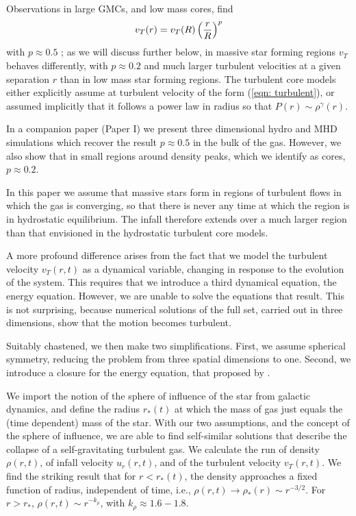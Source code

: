 \documentclass[iop,apj,numberedappendix]{emulateapj}
\newcommand       \be		{\begin{equation}}
\newcommand       \ee		{\end{equation}}
\begin{document}
Observations in large GMCs, and low mass cores, find 
%
\be \label{eqn: turbulent} %
v_T(r)=v_T(R)\left({r\over R}\right)^p
\ee  %
%
with $p\approx 0.5$ \citep{1981MNRAS.194..809L, 1988ApJ...329..392M};
as we will discuss further below, in massive star forming regions
$v_T$ behaves differently, with $p\approx0.2$ and much larger
turbulent velocities at a given separation $r$ than in low mass star
forming regions. The turbulent core models either explicitly assume at
turbulent velocity of the form (\ref{eqn: turbulent}), or assumed
implicitly that it follows a power law in radius so that $P(r)\sim
\rho^\gamma(r)$. 

In a companion paper \citep{2014arXiv1406.4148L} (Paper I) we present
three dimensional hydro and MHD simulations which recover the result
$p\approx 0.5$ in the bulk of the gas. However, we also show that in
small regions around density peaks, which we identify as cores,
$p\approx 0.2$.

In this paper we assume that massive stars form in regions of
turbulent flows in which the gas is converging, so that there is never
any time at which the region is in hydrostatic equilibrium. The infall
therefore extends over a much larger region than that envisioned in the
hydrostatic turbulent core models. 

A more profound difference arises from the fact that we model
the turbulent velocity $v_T(r,t)$ as a dynamical variable, changing in
response to the evolution of the system. This requires that we
introduce a third dynamical equation, the energy equation. However,
we are unable to solve the equations that result. This is not
surprising, because numerical solutions of the full set, carried out
in three dimensions, show that the motion becomes turbulent. 

Suitably chastened, we then make two simplifications. First, we assume
spherical symmetry, reducing the problem from three spatial dimensions
to one. Second, we introduce a closure for the energy equation, that
proposed by \citet{2012ApJ...750L..31R}.

We import the notion of the sphere of influence of the star from
galactic dynamics, and define the radius $r_*(t)$ at which the mass of
gas just equals the (time dependent) mass of the star. With our two
assumptions, and the concept of the sphere of influence, we are able
to find self-similar solutions that describe the collapse of a
self-gravitating turbulent gas. We calculate the run of density
$\rho(r,t)$, of infall velocity $u_r(r,t)$, and of the turbulent
velocity $v_T(r,t)$. We find the striking result that for $r<r_*(t)$,
the density approaches a fixed function of radius, independent of
time, i.e., $\rho(r,t)\to \rho_*(r)\sim r^{-3/2}$. For $r>r_*$,
$\rho(r,t)\sim r^{-k_\rho}$, with $k_\rho\approx 1.6-1.8$.
\end{document}

